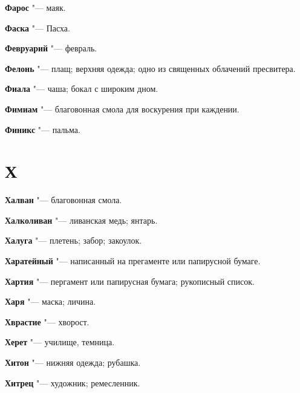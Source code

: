 \begin{mymulticols}{2}
\noindent\textbf{Фарос} "--- маяк. 




\noindent\textbf{Фаска} "--- Пасха. 




\noindent\textbf{Февруарий} "--- февраль. 




\noindent\textbf{Фелонь} "--- плащ; верхняя одежда; одно из священных облачений пресвитера. 




\noindent\textbf{Фиала} "--- чаша; бокал с широким дном. 




\noindent\textbf{Фимиам} "--- благовонная смола для воскурения при каждении. 




\noindent\textbf{Финикс} "--- пальма. 




\section{Х}





\noindent\textbf{Халван} "--- благовонная смола. 




\noindent\textbf{Халколиван} "--- ливанская медь; янтарь. 




\noindent\textbf{Халуга} "--- плетень; забор; закоулок. 




\noindent\textbf{Харатейный} "--- написанный на прегаменте или папирусной бумаге. 




\noindent\textbf{Хартия} "--- пергамент или папирусная бумага; рукописный список. 




\noindent\textbf{Харя} "--- маска; личина. 




\noindent\textbf{Хврастие} "--- хворост. 




\noindent\textbf{Херет} "--- училище, темница. 




\noindent\textbf{Хитон} "--- нижняя одежда; рубашка. 




\noindent\textbf{Хитрец} "--- художник; ремесленник. 





\end{mymulticols}
